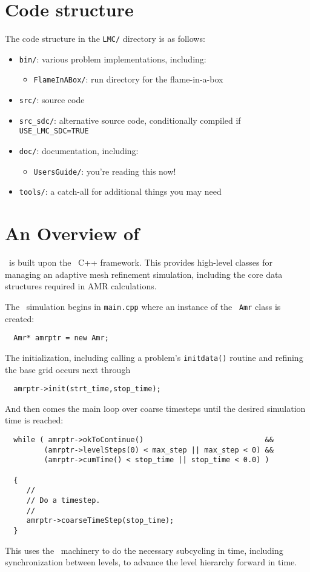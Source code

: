 \section{Code structure}

The code structure in the {\tt LMC/} directory is as follows:
\begin{itemize}
\item {\tt bin/}: various problem implementations, including:
  \begin{itemize}
  \item {\tt FlameInABox/}: run directory for the flame-in-a-box
  \end{itemize}

\item {\tt src/}: source code

\item {\tt src\_sdc/}: alternative source code, conditionally compiled if {\tt USE\_LMC\_SDC=TRUE}

\item {\tt doc/}: documentation, including:
\begin{itemize}
 \item {\tt UsersGuide/}: you're reading this now!
\end{itemize}

\item {\tt tools/}: a catch-all for additional things you may need 
\end{itemize}


\section{An Overview of \lmc}

\lmc\ is built upon the \boxlib\ C++ framework.  This provides
high-level classes for managing an adaptive mesh refinement simulation,
including the core data structures required in AMR calculations.

The \lmc\ simulation begins in {\tt main.cpp} where an instance
of the \boxlib\ {\tt Amr} class is created:
\begin{lstlisting}
  Amr* amrptr = new Amr;
\end{lstlisting}
The initialization, including calling a problem's {\tt initdata()}
routine and refining the base grid occurs next through
\begin{lstlisting}
  amrptr->init(strt_time,stop_time);
\end{lstlisting}
And then comes the main loop over coarse timesteps until the
desired simulation time is reached:
\begin{lstlisting}
  while ( amrptr->okToContinue()                            &&
         (amrptr->levelSteps(0) < max_step || max_step < 0) &&
         (amrptr->cumTime() < stop_time || stop_time < 0.0) )

  {
     //
     // Do a timestep.
     //
     amrptr->coarseTimeStep(stop_time);
  }
\end{lstlisting}
This uses the \boxlib\ machinery to do the necessary subcycling in time,
including synchronization between levels, to advance the level hierarchy
forward in time.  

